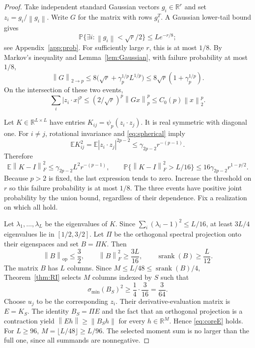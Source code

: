 \documentclass[11pt,letterpaper]{article}
\theoremstyle{definition}
\theoremstyle{remark}
\numberwithin{equation}{section}
\newcommand{\R}{\mathbb R}
\newcommand{\E}{\mathbb E}
\newcommand{\Prob}{\mathbb P}
\newcommand{\norm}[1]{\left\lVert#1\right\rVert}
\DeclareMathOperator{\sr}{srank}
\begin{document}
\begin{proof}
Take independent standard Gaussian vectors $g_i\in\R^r$ and set $z_i=g_i/\norm{g_i}$. Write $G$ for the matrix with rows $g_i^T$. A Gaussian lower-tail bound gives
\[
 \Prob\{\exists i:\norm{g_i}<\sqrt r/2\}\le Le^{-r/8};
\]
see Appendix~\ref{app:prob}. For sufficiently large $r$, this is at most $1/8$. By Markov's inequality and Lemma~\ref{lem:Gaussian}, with failure probability at most $1/8$,
\[
 \norm{G}_{2\to p}\le8\bigl(\sqrt r+\gamma_p^{1/p}L^{1/p}\bigr)
 \le8\sqrt r(1+\gamma_p^{1/p}).
\]
On the intersection of these two events,
\[
 \sum_i|z_i\cdot x|^p
 \le(2/\sqrt r)^p\norm{Gx}_p^p\le C_0(p)\norm{x}_2^p.
\]

Let $K\in\R^{L\times L}$ have entries $K_{ij}=\psi_p(z_i\cdot z_j)$. It is real symmetric with diagonal one. For $i\ne j$, rotational invariance and \eqref{eq:spherical} imply
\[
 \E K_{ij}^2=\E|z_i\cdot z_j|^{2p-2}
 \le\gamma_{2p-2}r^{-(p-1)}.
\]
Therefore
\begin{equation}\label{eq:coreFrob}
 \E\norm{K-I}_F^2\le\gamma_{2p-2}L^2r^{-(p-1)},\qquad
 \Prob\{\norm{K-I}_F^2>L/16\}
 \le16\gamma_{2p-2}r^{1-p/2}.
\end{equation}
Because $p>2$ is fixed, the last expression tends to zero. Increase the threshold on $r$ so this failure probability is at most $1/8$. The three events have positive joint probability by the union bound, regardless of their dependence. Fix a realization on which all hold.

Let $\lambda_1,\ldots,\lambda_L$ be the eigenvalues of $K$. Since
$\sum_i(\lambda_i-1)^2\le L/16$, at least $3L/4$ eigenvalues lie in $[1/2,3/2]$. Let $\Pi$ be the orthogonal spectral projection onto their eigenspaces and set $B=\Pi K$. Then
\begin{equation}\label{eq:truncated}
 \norm{B}_{\mathrm{op}}\le\frac32,\qquad
 \norm{B}_F^2\ge\frac{3L}{16},\qquad
 \sr(B)\ge\frac L{12}.
\end{equation}
The matrix $B$ has $L$ columns. Since $M\le L/48\le\sr(B)/4$, Theorem~\ref{thm:RI} selects $M$ columns indexed by $S$ such that
\[
 \sigma_{\min}(B_S)^2\ge\frac14\cdot\frac3{16}=\frac3{64}.
\]
Choose $u_j$ to be the corresponding $z_i$. Their derivative-evaluation matrix is $E=K_S$. The identity $B_S=\Pi E$ and the fact that an orthogonal projection is a contraction yield
$\norm{Eh}\ge\norm{B_Sh}$ for every $h\in\R^M$. Hence \eqref{eq:coreE} holds. For $L\ge96$, $M=\lfloor L/48\rfloor\ge L/96$. The selected moment sum is no larger than the full one, since all summands are nonnegative.
\end{proof}
\end{document}
